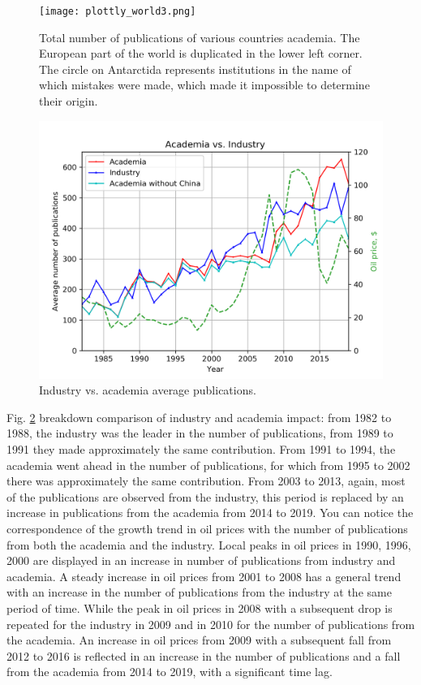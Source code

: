 \documentclass[geosciences,article,submit,moreauthors,pdftex]{Definitions/mdpi}
\begin{document}
\begin{figure}[ht!]
\centering
\texttt{[image: plottly\_world3.png]}
\caption{Total number of publications of various countries academia. The European part of the world is duplicated in the lower left corner. The circle on Antarctida represents institutions in the name of which mistakes were made, which made it impossible to determine their origin.}
\label{acad_world}
\end{figure}

\begin{figure}[ht!]
\centering
\includegraphics[scale=0.7]{acad_indus_plot.png}
\caption{Industry vs. academia average publications.}
\label{acad_vs_ind}
\end{figure}

Fig. \ref{acad_vs_ind} breakdown comparison of industry and academia impact: from 1982 to 1988, the industry was the leader in the number of publications, from 1989 to 1991 they made approximately the same contribution. From 1991 to 1994, the academia went ahead in the number of publications, for which from 1995 to 2002 there was approximately the same contribution. From 2003 to 2013, again, most of the publications are observed from the industry, this period is replaced by an increase in publications from the academia from 2014 to 2019. You can notice the correspondence of the growth trend in oil prices with the number of publications from both the academia and the industry. Local peaks in oil prices in 1990, 1996, 2000 are displayed in an increase in number of publications from industry and academia. A steady increase in oil prices from 2001 to 2008 has a general trend with an increase in the number of publications from the industry at the same period of time. While the peak in oil prices in 2008 with a subsequent drop is repeated for the industry in 2009 and in 2010 for the number of publications from the academia. An increase in oil prices from 2009 with a subsequent fall from 2012 to 2016 is reflected in an increase in the number of publications and a fall from the academia from 2014 to 2019, with a significant time lag.
\end{document}
